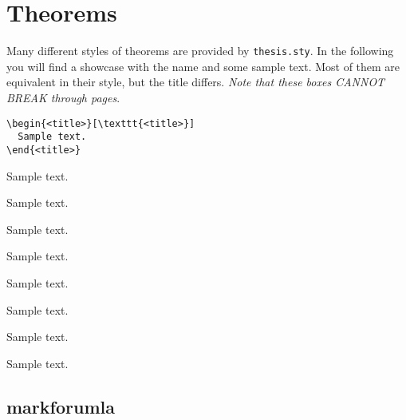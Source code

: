 \documentclass[book]{scrbook}
\newcommand\thesis{\texttt{thesis.sty}}
\begin{document}
\section{Theorems}

Many different styles of theorems are provided by \thesis. In the following you will find a showcase with the name and some sample text. Most of them are equivalent in their style, but the title differs. \emph{Note that these boxes CANNOT BREAK through pages}.
\begin{verbatim}
\begin{<title>}[\texttt{<title>}]
  Sample text.
\end{<title>}
\end{verbatim}

\begin{result}
  Sample text.
\end{result}

\begin{definition}
  Sample text.
\end{definition}

\begin{proposition}
  Sample text.
\end{proposition}

\begin{lemma}
  Sample text.
\end{lemma}

\begin{theorem}
  Sample text.
\end{theorem}

\begin{corollary}
  Sample text.
\end{corollary}

\begin{conjecture}
  Sample text.
\end{conjecture}

\begin{note}
  Sample text.
\end{note}

\subsection{markforumla}
\end{document}
